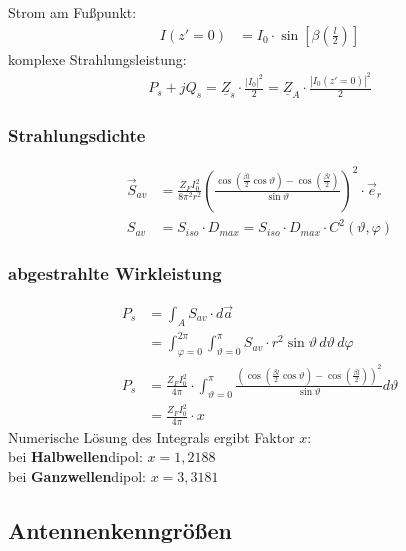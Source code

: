 Strom am Fußpunkt:
\begin{align*}
	I(z'=0) & = I_0\cdot\sin\left[\beta\left(\frac{l}{2}\right)\right]
\end{align*}
komplexe Strahlungsleistung:
\begin{align*}
	P_s +jQ_s = \underline{Z}_s\cdot \frac{|I_0|^2}{2} = \underline{Z}_A \cdot \frac{|I_0(z'=0)|^2}{2}
\end{align*}
\subsubsection{Strahlungsdichte}
\begin{align*}
    \vec{S}_{av} & = \frac{Z_FI_0^2}{8\pi^2 r^2}\left(\frac{\cos\left(\frac{\beta l }{2}\cos\vartheta\right)-\cos\left(\frac{\beta l}{2}\right)}{\sin\vartheta}\right)^2\cdot\vec{e}_r                               \\
    S_{av} & = S_{iso} \cdot D_{max} = S_{iso} \cdot D_{max} \cdot C^2(\vartheta, \varphi)
\end{align*}
\subsubsection{abgestrahlte Wirkleistung}
\begin{align*}
                P_{s} & = \int_A S_{av}\cdot d\vec{a}                                                                                                                                                              \\
                 & = \int^{2\pi}_{\varphi = 0}\int^{\pi}_{\vartheta = 0} S_{av}\cdot r^2 \sin\vartheta \, d\vartheta \, d\varphi\\
 P_{s}          & = \frac{Z_{F}I_0^2}{4\pi}\cdot\int^{\pi}_{\vartheta=0}\frac{\left(\cos\left(\frac{\beta l}{2}\cos\vartheta\right)-\cos\left(\frac{\beta l}{2}\right)\right)^2}{\sin\vartheta}d\vartheta\\
 &= \frac{Z_{F}I_0^2}{4\pi}\cdot x
\end{align*}
Numerische Lösung des Integrals ergibt Faktor $ x $:\\
bei \textbf{Halbwellen}dipol: $ x=1,2188 $\\
bei \textbf{Ganzwellen}dipol: $ x=3,3181$
\subsection{Antennenkenngrößen}



